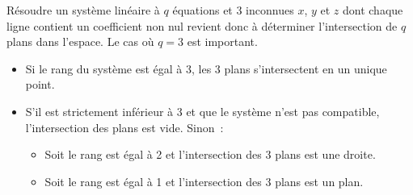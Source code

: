 \documentclass{magnolia}
\begin{document}
Résoudre un système linéaire à $q$ équations et 3 inconnues $x$, $y$ et 
$z$ dont chaque ligne contient un coefficient non nul revient donc à déterminer l'intersection de $q$ plans dans l'espace. Le cas où $q=3$ est important.
\begin{itemize}
\item Si le rang du système est égal à 3, les 3 plans s'intersectent en un unique point.
\item S'il est strictement inférieur à 3 et que le système n'est pas compatible, l'intersection des plans est vide. Sinon~:
\begin{itemize}
\item Soit le rang est égal à 2 et l'intersection des 3 plans est une droite.
\item Soit le rang est égal à 1 et l'intersection des 3 plans est un plan.
\end{itemize} 
\end{itemize}


\end{document}
